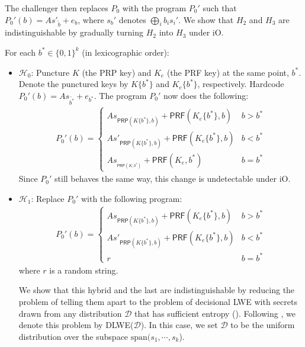 \documentclass{article}
\begin{document}
\begin{itemize}
    The challenger then replaces $P_0$ with the program $P_0'$ such that $P_0'(b) = As'_{\widetilde{b}} + e_b$, where $s_b'$ denotes $\bigoplus_i b_i s_i'$. We show that $H_2$ and $H_3$ are indistinguishable by gradually turning $H_2$ into $H_3$ under \textsf{iO}.
    
    For each $b^* \in \{0,1\}^{k}$ (in lexicographic order):
    \begin{itemize}
        \item $\mathcal{H}_0$: Puncture $K$ (the \textsf{PRP} key) and $K_e$ (the \textsf{PRF} key) at the same point, $b^*$. Denote the punctured keys by $K\{b^*\}$ and $K_e\{b^*\}$, respectively. Hardcode $P_0'(b) = As_{\widetilde{b^*}} + e_{b^*}$. The program $P_0'$ now does the following:
        \begin{align}
            P_0'(b) = 
            \begin{cases}
                As_{\textsf{PRP}(K\{b^*\}, b)} + \textsf{PRF}(K_e\{b^*\}, b) & b > b^* \\
                As'_{\textsf{PRP}(K\{b^*\}, b)} + \textsf{PRF}(K_e\{b^*\}, b) & b < b^* \\
                As_{_{\textsf{PRP}(K, b^*)}} + \textsf{PRF}(K_e, b^*) & b = b^*
            \end{cases}
        \end{align}
        Since $P_0'$ still behaves the same way, this change is undetectable under \textsf{iO}.
        \item $\mathcal{H}_1$: Replace $P_0'$ with the following program:
        \begin{align}
            P_0'(b) = 
            \begin{cases}
                As_{\textsf{PRP}(K\{b^*\}, b)} + \textsf{PRF}(K_e\{b^*\}, b) & b > b^* \\
                As'_{\textsf{PRP}(K\{b^*\}, b)} + \textsf{PRF}(K_e\{b^*\}, b) & b < b^* \\
                r & b = b^*
            \end{cases}
        \end{align}
        where $r$ is a random string.
        
        We show that this hybrid and the last are indistinguishable by reducing the problem of telling them apart to the problem of decisional LWE with secrets drawn from any distribution $\mathcal{D}$ that has sufficient entropy (\cite{robustness}). Following \cite{robustness}, we denote this problem by \textsf{DLWE}($\mathcal{D}$). In this case, we set $\mathcal{D}$ to be the uniform distribution over the subspace $\mathrm{span}(s_1, \cdots, s_k$).
        

\end{itemize}
\end{itemize}
\end{document}
